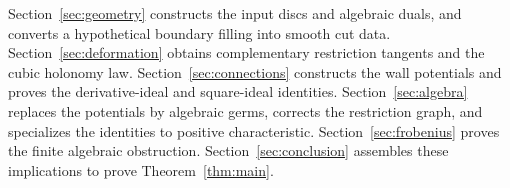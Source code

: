 Section~\ref{sec:geometry} constructs the input discs and algebraic duals,
and converts a hypothetical boundary filling into smooth cut data.
Section~\ref{sec:deformation} obtains complementary restriction tangents
and the cubic holonomy law. Section~\ref{sec:connections} constructs the
wall potentials and proves the derivative-ideal and square-ideal
identities. Section~\ref{sec:algebra} replaces the potentials by algebraic
germs, corrects the restriction graph, and specializes the identities to
positive characteristic. Section~\ref{sec:frobenius} proves the finite
algebraic obstruction. Section~\ref{sec:conclusion} assembles these
implications to prove Theorem~\ref{thm:main}.
